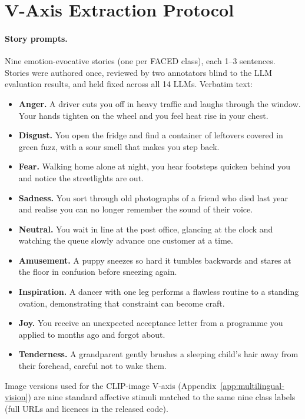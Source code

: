 \section{V-Axis Extraction Protocol}
\label{app:vaxis-protocol}

\paragraph{Story prompts.} Nine emotion-evocative stories (one per FACED
class), each 1--3 sentences. Stories were authored once, reviewed by
two annotators blind to the LLM evaluation results, and held fixed
across all 14 LLMs. Verbatim text:
\begin{itemize}
\item \textbf{Anger.} A driver cuts you off in heavy traffic and laughs through the window. Your hands tighten on the wheel and you feel heat rise in your chest.
\item \textbf{Disgust.} You open the fridge and find a container of leftovers covered in green fuzz, with a sour smell that makes you step back.
\item \textbf{Fear.} Walking home alone at night, you hear footsteps quicken behind you and notice the streetlights are out.
\item \textbf{Sadness.} You sort through old photographs of a friend who died last year and realise you can no longer remember the sound of their voice.
\item \textbf{Neutral.} You wait in line at the post office, glancing at the clock and watching the queue slowly advance one customer at a time.
\item \textbf{Amusement.} A puppy sneezes so hard it tumbles backwards and stares at the floor in confusion before sneezing again.
\item \textbf{Inspiration.} A dancer with one leg performs a flawless routine to a standing ovation, demonstrating that constraint can become craft.
\item \textbf{Joy.} You receive an unexpected acceptance letter from a programme you applied to months ago and forgot about.
\item \textbf{Tenderness.} A grandparent gently brushes a sleeping child's hair away from their forehead, careful not to wake them.
\end{itemize}
Image versions used for the CLIP-image V-axis (Appendix~\ref{app:multilingual-vision}) are nine standard affective stimuli matched to the same nine class labels (full URLs and licences in the released code).

